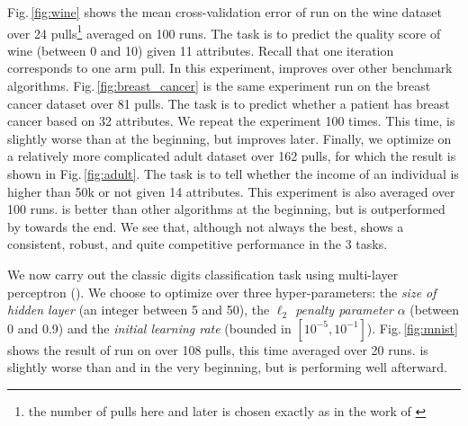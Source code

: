 Fig.\,\ref{fig:wine} shows the mean cross-validation error of \SVM run on the \UCI wine dataset over 24 pulls\footnote{the number of pulls here and later is chosen exactly as in the work of \citet{li2017hyperband}} averaged on 100 runs. The task is to predict the quality score  of wine (between 0 and 10) given 11 attributes. Recall that one iteration corresponds to one arm pull. In this experiment, \DTTTS improves over other benchmark algorithms. Fig.\,\ref{fig:breast_cancer} is the same experiment run on the \UCI breast cancer dataset over 81 pulls. The task is to predict whether a patient has breast cancer based on 32 attributes. We repeat the experiment 100 times. This time, \DTTTS is slightly worse than \Hyperband at the beginning, but improves later. Finally, we optimize \SVM on a relatively more complicated \UCI adult dataset over 162 pulls, for which the result is shown in Fig.\,\ref{fig:adult}. The task is to tell whether the income of an individual is higher than 50k or not given 14 attributes. This experiment is also averaged over 100 runs. \DTTTS is better than other algorithms at the beginning, but is outperformed by \TPE towards the end. We see that, although not always the best, \DTTTS shows a consistent, robust, and quite competitive performance in the 3 tasks. 

We now carry out the classic \MNIST digits classification task using multi-layer perceptron (\MLP). We choose to optimize over three hyper-parameters: the \emph{size of hidden layer} (an integer between 5 and 50), the \emph{$\ell_2$ penalty parameter} $\alpha$ (between 0 and 0.9) and the \emph{initial learning rate} (bounded in $\left[10^{-5}, 10^{-1} \right]$). Fig.\,\ref{fig:mnist} shows the result of \MLP run on \MNIST over 108 pulls, this time averaged over 20 runs. \DTTTS is slightly worse than \Hyperband and \HTTTS in the very beginning, but is performing well afterward. %


